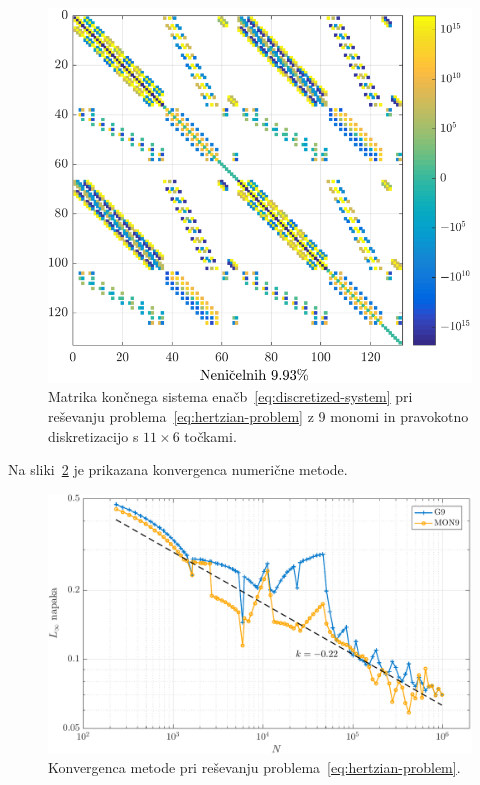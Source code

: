 \documentclass[12pt,a4paper,twoside]{article}
\theoremstyle{definition} %
\theoremstyle{plain} %
\numberwithin{equation}{section}
\newlength{\iw}
\begin{document}
\begin{figure}[h]
  \centering
  \includegraphics{images/hertzian_matrix_example.pdf}
  \caption{Matrika končnega sistema enačb~\eqref{eq:discretized-system} pri reševanju
  problema~\eqref{eq:hertzian-problem} z 9 monomi in pravokotno diskretizacijo s $11 \times 6$
točkami.}
  \label{fig:hertz-matrix}
\end{figure}

Na sliki~\ref{fig:hertz-convergence} je prikazana konvergenca numerične metode.

\begin{figure}[h]
  \centering
  \includegraphics[width=\iw]{images/hertzian_convergence.pdf}
  \caption{Konvergenca metode pri reševanju problema~\eqref{eq:hertzian-problem}.}
  \label{fig:hertz-convergence}
\end{figure}
\end{document}
